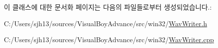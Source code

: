 이 클래스에 대한 문서화 페이지는 다음의 파일들로부터 생성되었습니다.\+:\begin{DoxyCompactItemize}
\item 
C\+:/\+Users/sjh13/sources/\+Visual\+Boy\+Advance/src/win32/\mbox{\hyperlink{_wav_writer_8h}{Wav\+Writer.\+h}}\item 
C\+:/\+Users/sjh13/sources/\+Visual\+Boy\+Advance/src/win32/\mbox{\hyperlink{_wav_writer_8cpp}{Wav\+Writer.\+cpp}}\end{DoxyCompactItemize}
